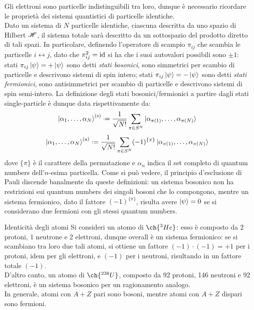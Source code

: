 Gli elettroni sono particelle indistinguibili tra loro, dunque è necessario ricordare le proprietà dei sistemi quantistici di particelle identiche. \\
Dato un sistema di $ N $ particelle identiche, ciascuna descritta da uno spazio di Hilbert $ \mathscr{H} $, il sistema totale sarà descritto da un sottospazio del prodotto diretto di tali spazi. In particolare, definendo l'operatore di scampio $ \pi_{ij} $ che scambia le particelle $ i \leftrightarrow j $, dato che $ \pi_{ij}^2 = \operatorname{id} $ si ha che i suoi autovalori possibili sono $ \pm 1 $: stati $ \pi_{ij} \ket{\psi} = + \ket{\psi} $ sono detti \textit{stati bosonici}, sono simmetrici per scambio di particelle e descrivono sistemi di spin intero; stati $ \pi_{ij} \ket{\psi} = - \ket{\psi} $ sono detti \textit{stati fermionici}, sono antisimmetrici per scambio di particelle e descrivono sistemi di spin semi-intero. La definizione degli stati bosonici/fermionici a partire dagli stati single-particle è dunque data rispettivamente da:
\begin{equation}
	\ket{\alpha_1 , \dots , \alpha_N}^\text{(s)} \defeq \frac{1}{\sqrt{N!}} \sum_{\pi \in S^N} \ket{\alpha_{\pi(1)} , \dots , \alpha_{\pi(N)}}
\end{equation}
\begin{equation}
	\ket{\alpha_1 , \dots , \alpha_N}^\text{(a)} \defeq \frac{1}{\sqrt{N!}} \sum_{\pi \in S^N} (-1)^{\{\pi\}} \ket{\alpha_{\pi(1)} , \dots , \alpha_{\pi(N)}}
\end{equation}
dove $ \{\pi\} $ è il carattere della permutazione e $ \alpha_n $ indica il set completo di quantum numbers dell'$ n $-esima particella. Come si può vedere, il principio d'esclusione di Pauli discende banalmente da queste definizioni: un sistema bosonico non ha restrizioni sui quantum numbers dei singoli bosoni che lo compongono, mentre un sistema fermionico, dato il fattore $ (-1)^{\{\pi\}} $, risulta avere $ \ket{\psi} = 0 $ se si considerano due fermioni con gli stessi quantum numbers.

\begin{example}{Identicità degli atomi}{}
	Si consideri un atomo di $ \ch{^3He} $: esso è composto da 2 protoni, 1 neutrone e 2 elettroni, dunque overall è un sistema fermionico: se si scambiano tra loro due tali atomi, si ottiene un fattore $ (-1)\cdot(-1) = +1 $ per i protoni, idem per gli elettroni, e $ (-1) $ per i neutroni, risultando in un fattore totale $ (-1) $. \\
	D'altro canto, un atomo di $ \ch{^{238}U} $, composto da 92 protoni, 146 neutroni e 92 elettroni, è un sistema bosonico per un ragionamento analogo. \\
	In generale, atomi con $ A + Z $ pari sono bosoni, mentre atomi con $ A + Z $ dispari sono fermioni.
\end{example}

